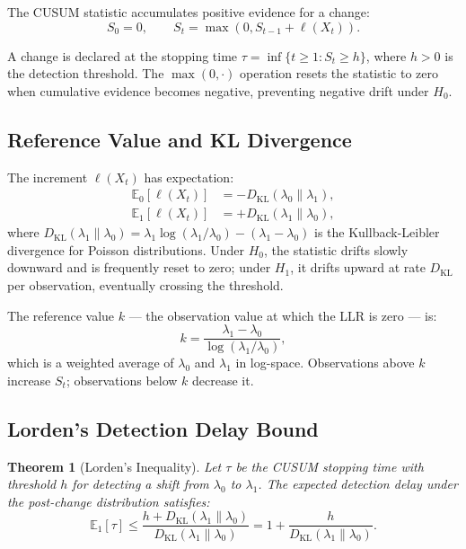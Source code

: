 \documentclass[11pt,twocolumn]{article}
\theoremstyle{plain}
\newtheorem{theorem}{Theorem}[section]
\theoremstyle{definition}
\begin{document}
The CUSUM statistic accumulates positive evidence for a change:
\begin{equation}
S_0 = 0, \qquad S_t = \max\left(0, S_{t-1} + \ell(X_t)\right).
\label{eq:cusum}
\end{equation}

A change is declared at the stopping time $\tau = \inf\{t \ge 1 : S_t \ge h\}$, where $h > 0$ is the detection threshold. The $\max(0, \cdot)$ operation resets the statistic to zero when cumulative evidence becomes negative, preventing negative drift under $H_0$.

\subsection{Reference Value and KL Divergence}

The increment $\ell(X_t)$ has expectation:
\begin{align}
\mathbb{E}_0[\ell(X_t)] &= -D_{\text{KL}}(\lambda_0 \parallel \lambda_1), \\
\mathbb{E}_1[\ell(X_t)] &= +D_{\text{KL}}(\lambda_1 \parallel \lambda_0),
\end{align}
where $D_{\text{KL}}(\lambda_1 \parallel \lambda_0) = \lambda_1 \log(\lambda_1/\lambda_0) - (\lambda_1 - \lambda_0)$ is the Kullback-Leibler divergence for Poisson distributions. Under $H_0$, the statistic drifts slowly downward and is frequently reset to zero; under $H_1$, it drifts upward at rate $D_{\text{KL}}$ per observation, eventually crossing the threshold.

The reference value $k$ --- the observation value at which the LLR is zero --- is:
\begin{equation}
k = \frac{\lambda_1 - \lambda_0}{\log(\lambda_1/\lambda_0)},
\label{eq:refval}
\end{equation}
which is a weighted average of $\lambda_0$ and $\lambda_1$ in log-space. Observations above $k$ increase $S_t$; observations below $k$ decrease it.

\subsection{Lorden's Detection Delay Bound}
\label{sec:lorden}

\begin{theorem}[Lorden's Inequality]
Let $\tau$ be the CUSUM stopping time with threshold $h$ for detecting a shift from $\lambda_0$ to $\lambda_1$. The expected detection delay under the post-change distribution satisfies:
\begin{equation}
\mathbb{E}_1[\tau] \le \frac{h + D_{\text{KL}}(\lambda_1 \parallel \lambda_0)}{D_{\text{KL}}(\lambda_1 \parallel \lambda_0)} = 1 + \frac{h}{D_{\text{KL}}(\lambda_1 \parallel \lambda_0)}.
\label{eq:lorden}
\end{equation}
\end{theorem}
\end{document}
